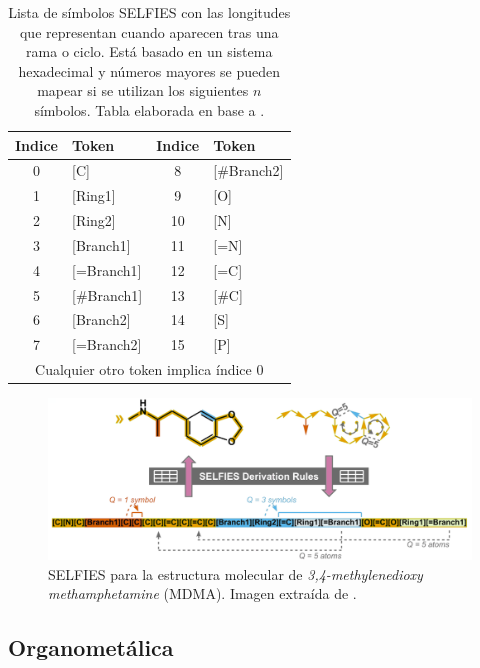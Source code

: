 \begin{table}[h!]
    \centering
    \small
    \begin{tabular}{|cl|cl|}
       \toprule 
       Indice & Token & Indice & Token \\
       \midrule
       0 & [C]          & 8     & [\#Branch2] \\
       1 & [Ring1]      & 9     & [O] \\
       2 & [Ring2]      & 10    & [N] \\
       3 & [Branch1]    & 11    & [=N] \\
       4 & [=Branch1]   & 12    & [=C] \\
       5 & [\#Branch1]  & 13    & [\#C] \\
       6 & [Branch2]    & 14    & [S] \\
       7 & [=Branch2]   & 15    & [P] \\
       \midrule
       \multicolumn{4}{|c|}{Cualquier otro token implica índice 0}\\
       \bottomrule
    \end{tabular}
    \caption{Lista de símbolos SELFIES con las longitudes que representan cuando aparecen tras una rama o ciclo. Está basado en un sistema hexadecimal y números mayores se pueden mapear si se utilizan los siguientes $n$ símbolos. Tabla elaborada en base a \cite{SELFIES}.}
    \label{tab:tokens_longitud}
\end{table}

\begin{figure}[h!]
    \centering
    \includegraphics[scale=0.43]{imagenes/estado_arte/teoria/selfies_ejemplo.png}
    \caption{SELFIES para la estructura molecular de \textit{3,4-methylenedioxy methamphetamine} (MDMA). Imagen extraída de \cite{SELFIES}.}
    \label{fig:selfies_ejemplo}
\end{figure}



\subsection{Organometálica} \label{teoria:ogm}

